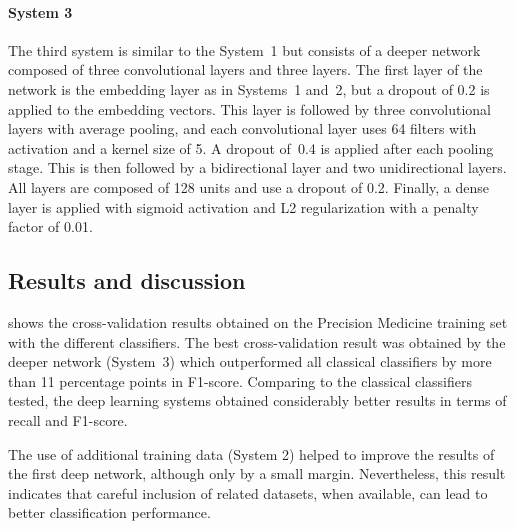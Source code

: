 \paragraph{System 3}

The third system is similar to the System~1 but consists of a deeper network composed of three convolutional layers and three  layers.
The first layer of the network is the embedding layer as in Systems~1 and~2, but a dropout of 0.2 is applied to the embedding vectors.
This layer is followed by three convolutional layers with average pooling, and each convolutional layer uses 64 filters with  activation and a kernel size of 5.
A dropout of~0.4 is applied after each pooling stage.
This is then followed by a bidirectional  layer and two unidirectional  layers.
All  layers are composed of 128 units and use a dropout of 0.2.
Finally, a dense layer is applied with sigmoid activation and L2 regularization with a penalty factor of 0.01.


\subsection{Results and discussion}



 shows the cross-validation results obtained on the Precision Medicine training set with the different classifiers.
The best cross-validation result was obtained by the deeper network (System~3) which outperformed all classical classifiers by more than 11 percentage points in F1-score.
Comparing to the classical classifiers tested, the deep learning systems obtained considerably better results in terms of recall and F1-score.

The use of additional training data (System 2) helped to improve the results of the first deep network, although only by a small margin.
Nevertheless, this result indicates that careful inclusion of related datasets, when available, can lead to better classification performance.



